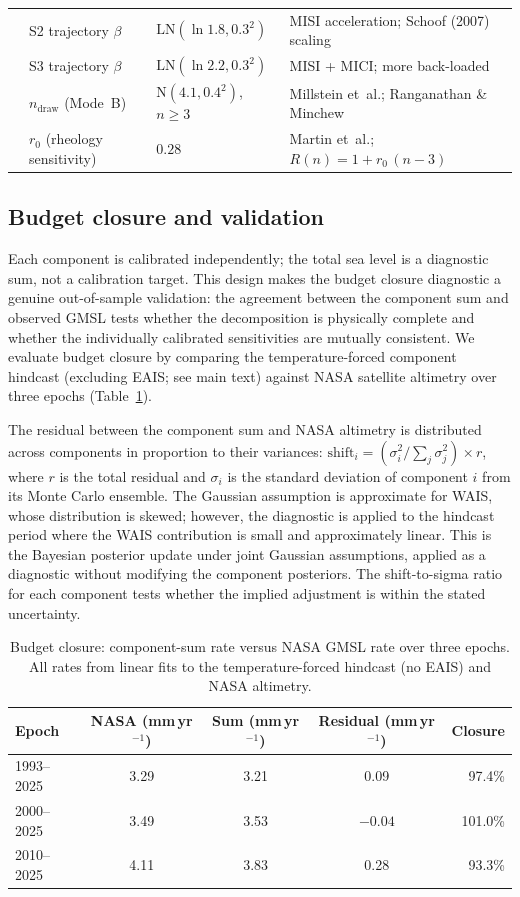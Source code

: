 \documentclass[12pt]{article}
\begin{document}
\begin{landscape}
\begin{longtable}{llll}
 & S2 trajectory $\beta$ & $\mathrm{LN}(\ln 1.8, 0.3^2)$ & MISI acceleration; Schoof (2007) scaling \\
 & S3 trajectory $\beta$ & $\mathrm{LN}(\ln 2.2, 0.3^2)$ & MISI + MICI; more back-loaded \\
 & $n_{\mathrm{draw}}$ (Mode~B) & $\mathrm{N}(4.1, 0.4^2)$, $n \geq 3$ & Millstein et~al.; Ranganathan \& Minchew \\
 & $r_0$ (rheology sensitivity) & $0.28$ & Martin et~al.; $R(n) = 1 + r_0\,(n - 3)$ \\
\end{longtable}
\end{landscape}


\subsection{Budget closure and validation}

Each component is calibrated independently; the total sea level is a diagnostic sum, not a calibration target. This design makes the budget closure diagnostic a genuine out-of-sample validation: the agreement between the component sum and observed GMSL tests whether the decomposition is physically complete and whether the individually calibrated sensitivities are mutually consistent. We evaluate budget closure by comparing the temperature-forced component hindcast (excluding EAIS; see main text) against NASA satellite altimetry over three epochs (Table~\ref{tab:budget_closure}).

The residual between the component sum and NASA altimetry is distributed across components in proportion to their variances: $\mathrm{shift}_i = (\sigma_i^2 / \sum_j \sigma_j^2) \times r$, where $r$ is the total residual and $\sigma_i$ is the standard deviation of component $i$ from its Monte Carlo ensemble. The Gaussian assumption is approximate for WAIS, whose distribution is skewed; however, the diagnostic is applied to the hindcast period where the WAIS contribution is small and approximately linear. This is the Bayesian posterior update under joint Gaussian assumptions, applied as a diagnostic without modifying the component posteriors. The shift-to-sigma ratio for each component tests whether the implied adjustment is within the stated uncertainty.

\begin{table}[h]
\centering
\caption{Budget closure: component-sum rate versus NASA GMSL rate over three epochs. All rates from linear fits to the temperature-forced hindcast (no EAIS) and NASA altimetry.}
\label{tab:budget_closure}
\begin{tabular}{lcccr}
\toprule
Epoch & NASA (mm\,yr$^{-1}$) & Sum (mm\,yr$^{-1}$) & Residual (mm\,yr$^{-1}$) & Closure \\
\midrule
1993--2025 & 3.29 & 3.21 & 0.09 & 97.4\% \\
2000--2025 & 3.49 & 3.53 & $-0.04$ & 101.0\% \\
2010--2025 & 4.11 & 3.83 & 0.28 & 93.3\% \\
\bottomrule
\end{tabular}
\end{table}
\end{document}
